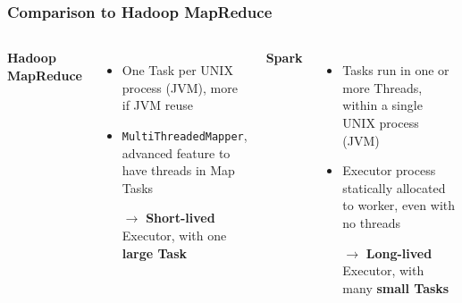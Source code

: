 \begin{frame}
\frametitle{Comparison to Hadoop MapReduce}
\begin{columns}[t, onlytextwidth]
	{\bf Hadoop MapReduce}
	\begin{itemize}
		\item One Task per UNIX process (JVM), more if JVM reuse
		\item \texttt{MultiThreadedMapper}, advanced feature to have threads in Map Tasks
		\item[$\to$] {\bf Short-lived} Executor, with one {\bf large Task}
	\end{itemize}

	
	{\bf Spark}		
	\begin{itemize}
		\item Tasks run in one or more Threads, within a single UNIX process (JVM)
		\item Executor process statically allocated to worker, even with no threads
		\item[$\to$] {\bf Long-lived} Executor, with many {\bf small Tasks}
	\end{itemize}

\end{columns}

\end{frame}

